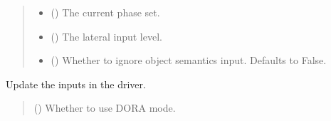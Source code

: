 \documentclass[letterpaper,10pt,english]{sphinxmanual}
\begin{document}
\begin{fulllineitems}
\begin{fulllineitems}
\begin{quote}
\begin{description}
\begin{itemize}
\item {} 
\sphinxAtStartPar
{} () \textendash{} The current phase set.

\item {} 
\sphinxAtStartPar
{} () \textendash{} The lateral input level.

\item {} 
\sphinxAtStartPar
{} (\sphinxstyleliteralemphasis{\sphinxupquote{, }}) \textendash{} Whether to ignore object semantics input. Defaults to False.

\end{itemize}

\end{description}\end{quote}

\end{fulllineitems}


\begin{fulllineitems}
\label{\detokenize{nodes:nodes.nodes.Nodes.update_inputs_driver}}
\pysigstartsignatures
\pysiglinewithargsret
{}
{}
{}
\pysigstopsignatures
\sphinxAtStartPar
Update the inputs in the driver.
\begin{quote}\begin{description}
\sphinxAtStartPar
{} () \textendash{} Whether to use DORA mode.

\end{description}\end{quote}

\end{fulllineitems}



\end{fulllineitems}
\end{document}
